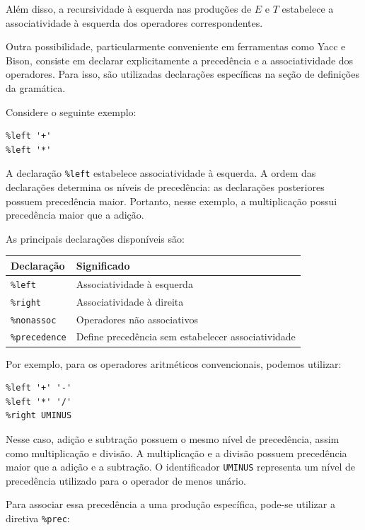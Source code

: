 \documentclass[
  brazilian,
  letterpaper,
]{book}
\theoremstyle{plain}
\theoremstyle{definition}
\theoremstyle{remark}
\begin{document}
Além disso, a recursividade à esquerda nas produções de \(E\) e \(T\)
estabelece a associatividade à esquerda dos operadores correspondentes.

Outra possibilidade, particularmente conveniente em ferramentas como
Yacc e Bison, consiste em declarar explicitamente a precedência e a
associatividade dos operadores. Para isso, são utilizadas declarações
específicas na seção de definições da gramática.

Considere o seguinte exemplo:

\begin{verbatim}
%left '+'
%left '*'
\end{verbatim}

A declaração \texttt{\%left} estabelece associatividade à esquerda. A
ordem das declarações determina os níveis de precedência: as declarações
posteriores possuem precedência maior. Portanto, nesse exemplo, a
multiplicação possui precedência maior que a adição.

As principais declarações disponíveis são:

\begin{longtable*}[]{|l|l|}
\toprule\noalign{}
Declaração & Significado \\
\midrule\noalign{}
\endhead
\bottomrule\noalign{}
\endlastfoot
\texttt{\%left} & Associatividade à esquerda \\
\midrule
\texttt{\%right} & Associatividade à direita \\
\midrule
\texttt{\%nonassoc} & Operadores não associativos \\
\midrule
\texttt{\%precedence} & Define precedência sem estabelecer
associatividade \\
\end{longtable*}

Por exemplo, para os operadores aritméticos convencionais, podemos
utilizar:

\begin{verbatim}
%left '+' '-'
%left '*' '/'
%right UMINUS
\end{verbatim}

Nesse caso, adição e subtração possuem o mesmo nível de precedência,
assim como multiplicação e divisão. A multiplicação e a divisão possuem
precedência maior que a adição e a subtração. O identificador
\texttt{UMINUS} representa um nível de precedência utilizado para o
operador de menos unário.

Para associar essa precedência a uma produção específica, pode-se
utilizar a diretiva \texttt{\%prec}:
\end{document}
